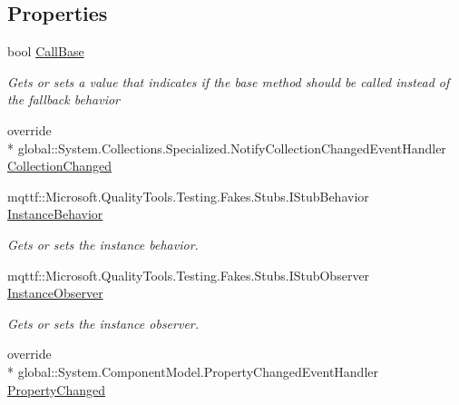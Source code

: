 \subsection*{Properties}
\begin{DoxyCompactItemize}
\item 
bool \hyperlink{class_system_1_1_collections_1_1_object_model_1_1_fakes_1_1_stub_read_only_observable_collection_3_01_t_01_4_abc74d42d723a8534e2254ec52dfc4459}{Call\-Base}
\begin{DoxyCompactList}\small\item\em Gets or sets a value that indicates if the base method should be called instead of the fallback behavior\end{DoxyCompactList}\item 
override \\*
global\-::\-System.\-Collections.\-Specialized.\-Notify\-Collection\-Changed\-Event\-Handler \hyperlink{class_system_1_1_collections_1_1_object_model_1_1_fakes_1_1_stub_read_only_observable_collection_3_01_t_01_4_a819e1834320ceece675b925070ba344a}{Collection\-Changed}
\item 
mqttf\-::\-Microsoft.\-Quality\-Tools.\-Testing.\-Fakes.\-Stubs.\-I\-Stub\-Behavior \hyperlink{class_system_1_1_collections_1_1_object_model_1_1_fakes_1_1_stub_read_only_observable_collection_3_01_t_01_4_a74f8ca68ca613d54a223bda0422ffb6f}{Instance\-Behavior}
\begin{DoxyCompactList}\small\item\em Gets or sets the instance behavior.\end{DoxyCompactList}\item 
mqttf\-::\-Microsoft.\-Quality\-Tools.\-Testing.\-Fakes.\-Stubs.\-I\-Stub\-Observer \hyperlink{class_system_1_1_collections_1_1_object_model_1_1_fakes_1_1_stub_read_only_observable_collection_3_01_t_01_4_a9679387b4a19bf25e1a472495afe848a}{Instance\-Observer}
\begin{DoxyCompactList}\small\item\em Gets or sets the instance observer.\end{DoxyCompactList}\item 
override \\*
global\-::\-System.\-Component\-Model.\-Property\-Changed\-Event\-Handler \hyperlink{class_system_1_1_collections_1_1_object_model_1_1_fakes_1_1_stub_read_only_observable_collection_3_01_t_01_4_a03580ebb8f7ff0b5d63d90625a653341}{Property\-Changed}
\end{DoxyCompactItemize}



